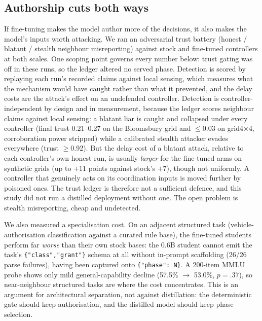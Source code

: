 \documentclass[conference]{IEEEtran}
\begin{document}
\subsection{Authorship cuts both ways}
If fine-tuning makes the model author more of the decisions, it also makes
the model's inputs worth attacking. We ran an adversarial trust battery
(honest / blatant / stealth neighbour misreporting) against stock and
fine-tuned controllers at both scales. One scoping point governs every
number below: trust gating was off in these runs, so the ledger altered no
served phase. Detection is scored by replaying each run's recorded claims
against local sensing, which measures what the mechanism would have caught
rather than what it prevented, and the delay costs are the attack's effect
on an undefended controller. Detection is controller-independent
by design and in measurement, because the ledger scores neighbour claims
against local sensing: a blatant liar is caught and collapsed under every
controller (final trust 0.21--0.27 on the Bloomsbury grid and $\le$0.03 on
grid4$\times$4, corroboration power stripped) while a
calibrated stealth attacker evades everywhere (trust $\ge$0.92). But the
delay cost of a blatant attack, relative to each controller's own honest
run, is usually \emph{larger} for the fine-tuned arms on synthetic grids
(up to $+11$ points against stock's $+7$), though not uniformly. A
controller that genuinely acts on its coordination inputs is moved
further by poisoned ones. The
trust ledger is therefore not a sufficient defence, and this study did not
run a distilled deployment without one. The open problem is stealth
misreporting, cheap and undetected.

We also measured a specialisation cost. On an adjacent structured task
(vehicle-authorisation classification against a curated rule base), the
fine-tuned students perform far \emph{worse} than their own stock bases:
the 0.6B student cannot emit the task's \texttt{\{"class","grant"\}}
schema at all without in-prompt scaffolding (26/26 parse failures),
having been captured onto \texttt{\{"phase": N\}}. A 200-item MMLU probe
shows only mild general-capability decline (57.5\% $\to$ 53.0\%,
$p{=}.37$), so near-neighbour structured tasks are where the cost
concentrates. This is an argument for architectural separation, not
against distillation: the deterministic gate should keep authorisation,
and the distilled model should keep phase selection.
\end{document}
